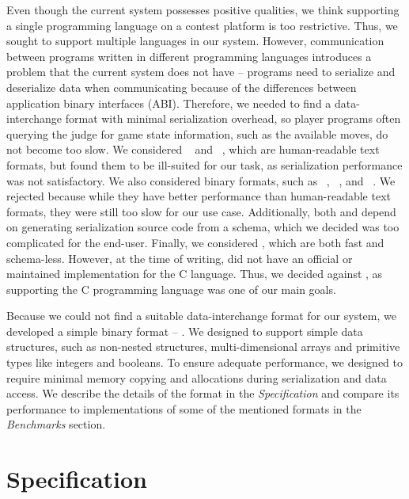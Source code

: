 Even though the current system possesses positive qualities, we think supporting a single programming language on a contest platform is too restrictive. Thus, we sought to support multiple languages in our system. However, communication between programs written in different programming languages introduces a problem that the current system does not have -- programs need to serialize and deserialize data when communicating because of the differences between application binary interfaces (ABI). Therefore, we needed to find a data-interchange format with minimal serialization overhead, so player programs often querying the judge for game state information, such as the available moves, do not become too slow. We considered ~\cite{json} and ~\cite{xml}, which are human-readable text formats, but found them to be ill-suited for our task, as serialization performance was not satisfactory. We also considered binary formats, such as ~\cite{Protobuf}, ~\cite{Flatbuf}, and ~\cite{Flexbuf}. We rejected  because while they have better performance than human-readable text formats, they were still too slow for our use case. Additionally, both  and  depend on generating serialization source code from a schema, which we decided was too complicated for the end-user. Finally, we considered , which are both fast and schema-less. However, at the time of writing,  did not have an official or maintained implementation for the C language. Thus, we decided against , as supporting the C programming language was one of our main goals. 

Because we could not find a suitable data-interchange format for our system, we developed a simple binary format -- . We designed  to support simple data structures, such as non-nested structures, multi-dimensional arrays and primitive types like integers and booleans. To ensure adequate performance, we designed  to require minimal memory copying and allocations during serialization and data access. We describe the details of the  format in the \emph{Specification} and compare its performance to implementations of some of the mentioned formats in the \emph{Benchmarks} section.

\section{Specification}

